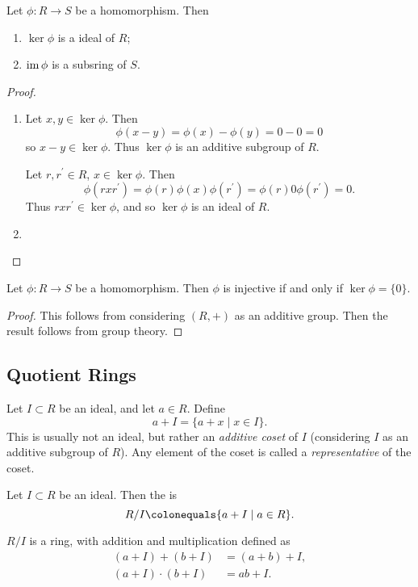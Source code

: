 \begin{lemma}
Let $\phi\colon R\to S$ be a homomorphism. Then
\begin{enumerate}[label=(\roman*)]
\item $\ker\phi$ is a ideal of $R$;
\item $\operatorname{im}\phi$ is a subsring of $S$.
\end{enumerate}
\end{lemma}

\begin{proof} \
\begin{enumerate}[label=(\roman*)]
\item Let $x,y\in\ker\phi$. Then
\[\phi(x-y)=\phi(x)-\phi(y)=0-0=0\]
so $x-y\in\ker\phi$. Thus $\ker\phi$ is an additive subgroup of $R$.

Let $r,r^\prime\in R$, $x\in\ker\phi$. Then
\[\phi(rxr^\prime)=\phi(r)\phi(x)\phi(r^\prime)=\phi(r)0\phi(r^\prime)=0.\]
Thus $rxr^\prime\in\ker\phi$, and so $\ker\phi$ is an ideal of $R$.

\item 
\end{enumerate}
\end{proof}

\begin{lemma}
Let $\phi\colon R\to S$ be a homomorphism. Then $\phi$ is injective if and only if $\ker\phi=\{0\}$.
\end{lemma}

\begin{proof}
This follows from considering $(R,+)$ as an additive group. Then the result follows from group theory.
\end{proof}

\subsection{Quotient Rings}
Let $I\subset R$ be an ideal, and let $a\in R$. Define
\[a+I=\{a+x\mid x\in I\}.\]
This is usually not an ideal, but rather an \emph{additive coset} of $I$ (considering $I$ as an additive subgroup of $R$).
Any element of the coset is called a \emph{representative} of the coset. 

\begin{definition}
Let $I\subset R$ be an ideal. Then the  is
\[R/I\colonequals\{a+I\mid a\in R\}.\]
\end{definition}

\begin{lemma*}
$R/I$ is a ring, with addition and multiplication defined as
\begin{align*}
(a+I)+(b+I)&=(a+b)+I,\\
(a+I)\cdot(b+I)&=ab+I.
\end{align*}
\end{lemma*}

